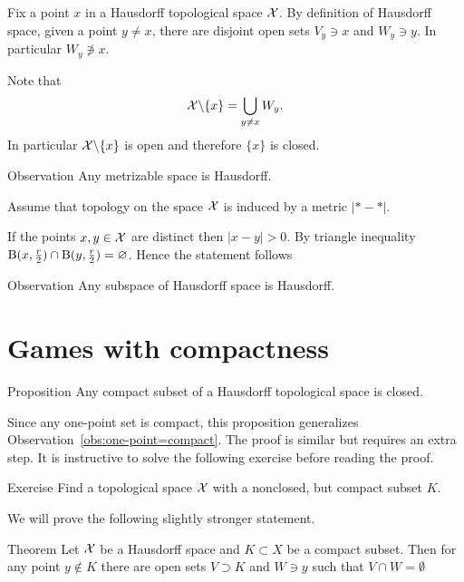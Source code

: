 Fix a point $x$ in a Hausdorff topological space $\mathcal{X}$.
By definition of Hausdorff space, given a point $y\ne x$,
there are disjoint open sets $V_y\ni x$ and $W_y\ni y$.
In particular $W_y\not\ni x$.

Note that 
\[\mathcal{X}\backslash\{x\}=\bigcup_{y\ne x}W_y.\]
In particular $\mathcal{X}\backslash\{x\}$ is open and therefore $\{x\}$ is closed.
\qeds

\begin{thm}{Observation}
Any metrizable space is Hausdorff.
\end{thm}

Assume that topology on the space $\mathcal{X}$ is induced by a metric $|{*}-{*}|$.

If the points $x,y\in\mathcal{X}$ are distinct then $|x-y|>0$.
By triangle inequality 
$\mathrm{B}(x,\tfrac r2)\cap \mathrm{B}(y,\tfrac r2)=\varnothing$.
Hence the statement follows
\qeds


\begin{thm}{Observation}
Any subspace of Hausdorff space is Hausdorff.
\end{thm}



\section{Games with compactness}

\begin{thm}{Proposition}\label{prop:hausdorff-compact-closed}
Any compact  subset of a Hausdorff topological space is closed. 
\end{thm}

Since any one-point set is compact, this proposition generalizes Observation~\ref{obs:one-point=compact}.
The proof is similar but requires an extra step.
It is instructive to solve the following exercise before reading the proof.

\begin{thm}{Exercise}
Find a topological space $\mathcal{X}$ with a nonclosed, but compact subset $K$. 
\end{thm}

We will prove the following slightly stronger statement.

\begin{thm}{Theorem}\label{thm:hausdorff-compact-t3}
Let $\mathcal{X}$ be a Hausdorff space and $K\subset X$ be a compact subset.
Then for any point $y\notin K$ there are open sets $V\supset K$ and $W\ni y$
such that $V\cap W=\emptyset$
\end{thm}

